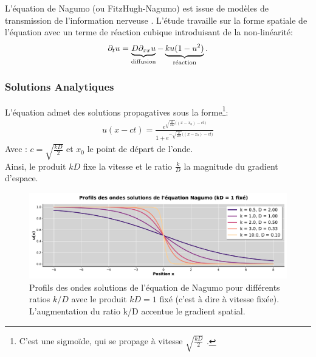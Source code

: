\label{par:analyser_operateurs_nagumo}
L'équation de Nagumo (ou FitzHugh-Nagumo) est issue de modèles de transmission de l'information nerveuse \cite{FITZHUGH1961445}.
L'étude travaille sur la forme spatiale de l'équation \cite{keener1998mathematical} avec un terme de réaction cubique introduisant de la non-linéarité:
\begin{align}
    \partial_t u = \underbrace{D \partial_{xx} u}_{\text{diffusion}}
            - \underbrace{ku(1-u^2)}_{\text{réaction}}.
\end{align}
\subsubsection{Solutions Analytiques}
L'équation admet des solutions propagatives sous la forme\footnote{C'est une sigmoïde, qui se propage à vitesse $\sqrt{\frac{kD}{2}}$ \cite{duart2011}.}:
\begin{align}
    \label{eq:sol_nagumo}
    u(x-ct) = \frac{e^{
        \sqrt{\frac{k}{2D}} \bigl((x-x_0) - ct \bigr)}
    }
    {1 + e^{
        -\sqrt{\frac{k}{2D}} \bigl((x-x_0) - ct \bigr)}
    }
\end{align}
Avec : $c = \sqrt{\frac{kD}{2}}$ et $x_0$ le point de départ de l'onde.\\
Ainsi, le produit $kD$ fixe la vitesse et le ratio $\frac{k}{D}$ la magnitude du gradient d'espace.

\begin{figure}[htbp]
    \centering
    \includegraphics[width=\textwidth]{media/4_travail/2_nagumo/profils_nagumo.pdf}
    \caption{Profils des ondes solutions de l'équation de Nagumo pour différents ratios $k/D$ avec le produit $kD = 1$ fixé (c'est à dire à vitesse fixée). L'augmentation du ratio k/D accentue le gradient spatial.}
    \label{fig:profils_nagumo}
\end{figure}

